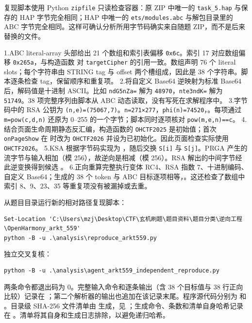 复现脚本使用 Python \texttt{zipfile} 只读检查容器：原 ZIP 中唯一的 \texttt{task\_5.hap} 与保存的 HAP 字节完全相同；HAP 中唯一的 \texttt{ets/modules.abc} 与解包目录里的 ABC 字节完全相同。这样可确认分析所用字节码确实来自随题 ZIP，而不是后来替换的文件。

1.ABC literal-array 头部给出 21 个数组和索引表偏移 \texttt{0x6c}。索引 17 对应数组偏移 \texttt{0x265a}，与构造函数 \texttt{} 对 \texttt{targetCipher} 的引用一致。数组声明 76 个 literal slots；每个字符串由 STRING tag 与 offset 两个槽组成，因此是 38 个字符串。脚本逐条检查 tag，保留顺序和重复项。 2.将自定义 Base64 逆映射为标准 Base64 后，解码值是十进制 ASCII。比如 \texttt{ndG5nZa=} 解为 \texttt{48970}，\texttt{nte3ndK=} 解为 \texttt{51749}。38 项完整序列由脚本从 ABC 动态读取，没有写死在求解程序中。 3.字节码中的 RSA 公钥为 \texttt{(n,e)=(75067,7)}。\texttt{n=271×277}，\texttt{phi(n)=74520}，\texttt{}。每项通过 \texttt{m=pow(c,d,n)} 还原为 0--255 的一个字节；脚本同时逐项核对 \texttt{pow(m,e,n)==c}。 4.结合页面生命周期静态反汇编，构造函数的 \texttt{OHCTF2025} 是初始值；首次 \texttt{onPageShow} 在 \texttt{} 时改为 \texttt{OHCTF2026} 并设为已初始化。因此页面检查实际使用 \texttt{OHCTF2026}。 5.KSA 根据字节码实现为 \texttt{}，随后交换 \texttt{S{[}i{]}} 与 \texttt{S{[}j{]}}。PRGA 产生的流字节与输入相加（模 256），故逆向是相减（模 256）。RSA 解出的中间字节经此逆变换得到候选 \texttt{}。 6.正向重算完整执行变体 RC4、RSA 指数 7、十进制编码、自定义 Base64；生成的 38 个 token 与 ABC 目标逐项相等，\texttt{}。这还检查了数组中索引 8、9、23、35 等重复项没有被漏掉或去重。

从题目目录运行新的相对路径复现脚本：

\begin{verbatim}
Set-Location 'C:\Users\mzj\Desktop\CTF\玄机刷题\题目资料\题目分类\逆向工程\OpenHarmony_arkt_559'
python -B -u .\analysis\reproduce_arkt559.py
\end{verbatim}

独立交叉复核：

\begin{verbatim}
python -B -u .\analysis\agent_arkt559_independent_reproduce.py
\end{verbatim}

两条命令都退出码为 0。完整输入命令和逐条输出（含 38 个目标值与 38 行正向比较）记录在 \texttt{}；第二个解析器的输出也追加在该记录末尾。程序源代码分别为 \texttt{} 和 \texttt{}。目录级 SHA-256 文件清单由 \texttt{} 生成，见 \texttt{}；生成命令、条数和清单自身哈希记录在 \texttt{}。清单将其自身和生成日志排除，以避免递归哈希。

